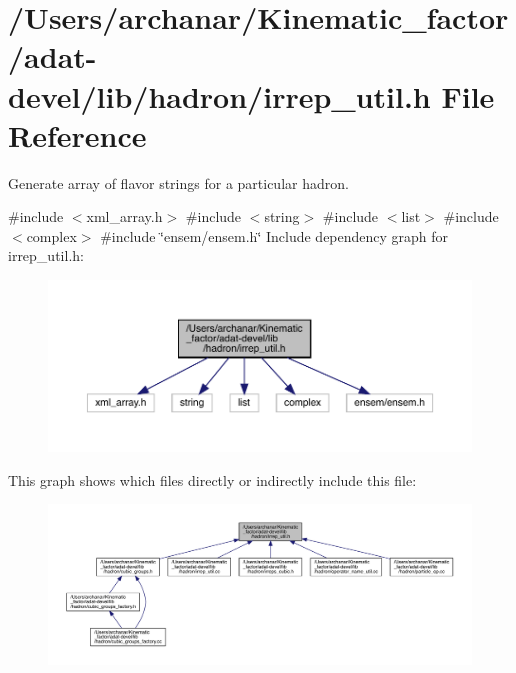 \hypertarget{adat-devel_2lib_2hadron_2irrep__util_8h}{}\section{/\+Users/archanar/\+Kinematic\+\_\+factor/adat-\/devel/lib/hadron/irrep\+\_\+util.h File Reference}
\label{adat-devel_2lib_2hadron_2irrep__util_8h}


Generate array of flavor strings for a particular hadron.  


{\ttfamily \#include $<$xml\+\_\+array.\+h$>$}\newline
{\ttfamily \#include $<$string$>$}\newline
{\ttfamily \#include $<$list$>$}\newline
{\ttfamily \#include $<$complex$>$}\newline
{\ttfamily \#include \char`\"{}ensem/ensem.\+h\char`\"{}}\newline
Include dependency graph for irrep\+\_\+util.\+h\+:
\nopagebreak
\begin{figure}[H]
\begin{center}
\leavevmode
\includegraphics[width=350pt]{dd/d05/adat-devel_2lib_2hadron_2irrep__util_8h__incl}
\end{center}
\end{figure}
This graph shows which files directly or indirectly include this file\+:
\nopagebreak
\begin{figure}[H]
\begin{center}
\leavevmode
\includegraphics[width=350pt]{d6/d14/adat-devel_2lib_2hadron_2irrep__util_8h__dep__incl}
\end{center}
\end{figure}
